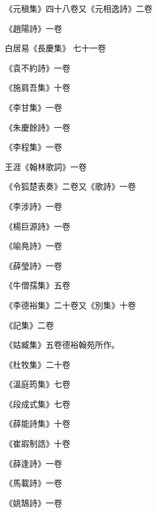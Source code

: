 \begin{pinyinscope}
 《元稹集》四十八卷又《元相逸詩》二卷



 《趙陽詩》一卷



 白居易《長慶集》
 七十一卷



 《袁不約詩》一卷



 《施肩吾集》十卷



 《李甘集》一卷



 《朱慶餘詩》一卷



 《李程集》一卷



 王涯《翰林歌詞》一卷



 《令狐楚表奏》二卷又《歌詩》一卷



 《李涉詩》一卷



 《楊巨源詩》一卷



 《喻鳧詩》一卷



 《薛瑩詩》一卷



 《牛僧孺集》五卷



 《李德裕集》二十卷又《別集》十卷



 《記集》二卷



 《姑臧集》五卷德裕翰苑所作。



 《杜牧集》二十卷



 《溫庭筠集》七卷



 《段成式集》七卷



 《薛能詩集》十卷



 《崔嘏制誥》十卷



 《薛逢詩》一卷



 《馬載詩》一卷



 《姚鵠詩》一卷




\end{pinyinscope}
